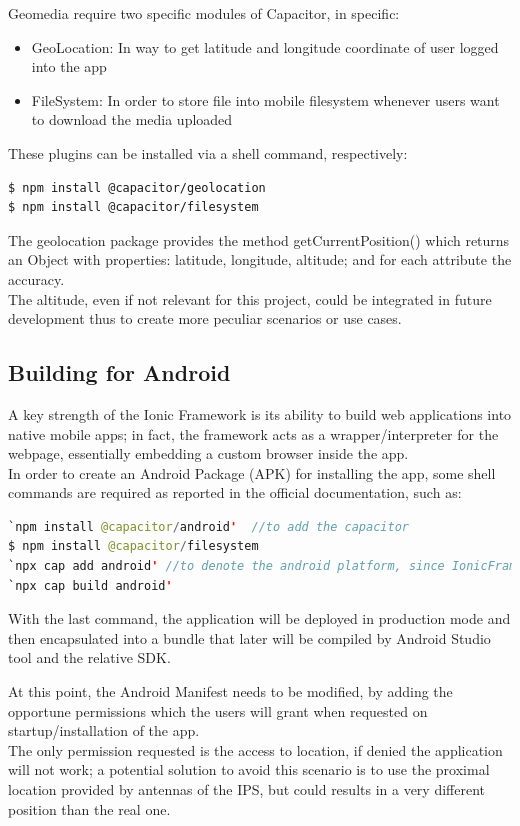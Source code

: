 \documentclass[conference]{IEEEtran}
\begin{document}
Geomedia require two specific modules of Capacitor, in specific:
\begin{itemize}
    \item GeoLocation\cite{b2}: In way to get latitude and longitude coordinate of user logged into the app
    \item FileSystem\cite{b3}: In order to store file into mobile filesystem whenever users want to download the media uploaded
\end{itemize}

These plugins can be installed via a shell command, respectively:
\begin{lstlisting}[language=Sh]
$ npm install @capacitor/geolocation
$ npm install @capacitor/filesystem
\end{lstlisting}

The geolocation package provides the method getCurrentPosition() which returns an Object with properties: latitude, longitude, altitude; and for each attribute the accuracy.
\\
The altitude, even if not relevant for this project, could be integrated in future development thus to create more peculiar scenarios or use cases.


\subsection{Building for Android}

A key strength of the Ionic Framework is its ability to build web applications into native mobile apps; in fact, the framework acts as a wrapper/interpreter for the webpage, essentially embedding a custom browser inside the app.
\\
In order to create an Android Package (APK) for installing the app, some shell commands are required as reported in the official documentation, such as:
\begin{lstlisting}[language=Java]
`npm install @capacitor/android'  //to add the capacitor
$ npm install @capacitor/filesystem
`npx cap add android' //to denote the android platform, since IonicFramework can also build for "iOS" operating system
`npx cap build android' 
\end{lstlisting}
With the last command, the application will be deployed in production mode and then encapsulated into a bundle that later will be compiled by Android Studio \cite{b11} tool and the relative SDK.



At this point, the Android Manifest needs to be modified, by adding the opportune permissions which the users will grant when requested on startup/installation of the app.
\\
The only permission requested is the access to location, if denied the application will not work; a potential solution to avoid this scenario is to use the proximal location provided by antennas of the IPS, but could results in a very different position than the real one.
\end{document}
